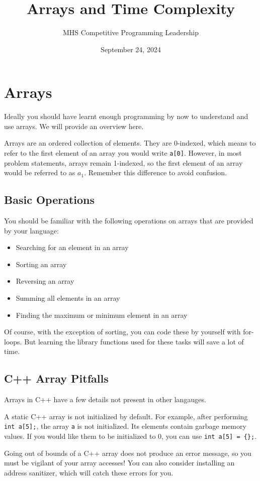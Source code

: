 \documentclass{article}
\title{Arrays and Time Complexity}
\date{September 24, 2024}
\author{MHS Competitive Programming Leadership}
\begin{document}
\maketitle
\section{Arrays}
Ideally you should have learnt enough programming by now to understand and use arrays. We will provide an overview here.

Arrays are an ordered collection of elements. They are 0-indexed, which means to refer to the first element of an array you would write \verb/a[0]/. However, in most problem statements, arrays remain 1-indexed, so the first element of an array would be referred to as $a_1$. Remember this difference to avoid confusion.

\subsection{Basic Operations}
You should be familiar with the following operations on arrays that are provided by your language:
\begin{itemize}
\item Searching for an element in an array
\item Sorting an array
\item Reversing an array
\item Summing all elements in an array
\item Finding the maximum or minimum element in an array
\end{itemize}
Of course, with the exception of sorting, you can code these by yourself with for-loops. But learning the library functions used for these tasks will save a lot of time.

\subsection{C++ Array Pitfalls}
Arrays in C++ have a few details not present in other langauges.

A static C++ array is not initialized by default. 
For example, after performing \verb/int a[5];/, the array \verb/a/ is not initialized. Its elements contain garbage memory values. If you would like them to be initialized to 0, you can use \verb/int a[5] = {};/.

Going out of bounds of a C++ array does not produce an error message, so you must be vigilant of your array accesses! You can also consider installing an address sanitizer, which will catch these errors for you.
\end{document}
